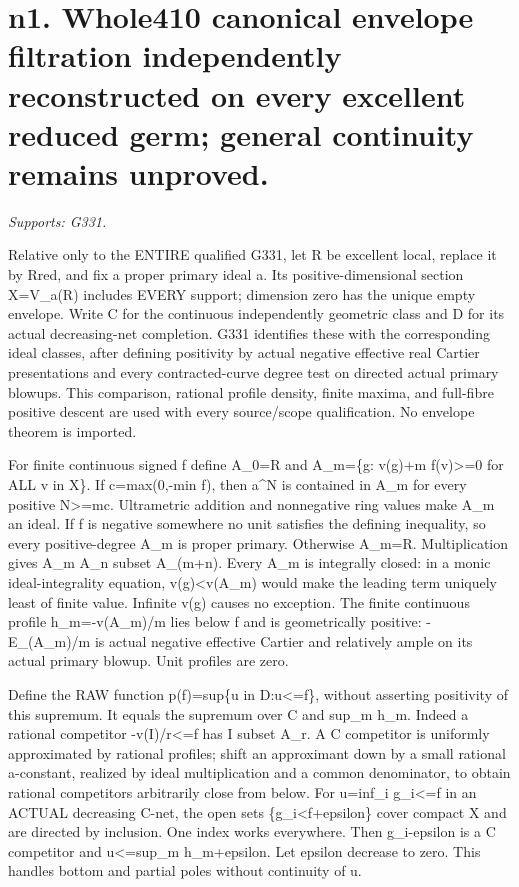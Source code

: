 \section{n1. Whole410 canonical envelope filtration independently reconstructed on every excellent reduced germ; general continuity remains unproved.}
\textit{Supports: G331.}

Relative only to the ENTIRE qualified G331, let R be excellent local, replace it by Rred, and fix a proper primary ideal a. Its positive-dimensional section X=V\_a(R) includes EVERY support; dimension zero has the unique empty envelope. Write C for the continuous independently geometric class and D for its actual decreasing-net completion. G331 identifies these with the corresponding ideal classes, after defining positivity by actual negative effective real Cartier presentations and every contracted-curve degree test on directed actual primary blowups. This comparison, rational profile density, finite maxima, and full-fibre positive descent are used with every source/scope qualification. No envelope theorem is imported.

For finite continuous signed f define A\_0=R and A\_m=\{g: v(g)+m f(v)\textgreater{}=0 for ALL v in X\}. If c=max(0,-min f), then a\textasciicircum{}N is contained in A\_m for every positive N\textgreater{}=mc. Ultrametric addition and nonnegative ring values make A\_m an ideal. If f is negative somewhere no unit satisfies the defining inequality, so every positive-degree A\_m is proper primary. Otherwise A\_m=R. Multiplication gives A\_m A\_n subset A\_(m+n). Every A\_m is integrally closed: in a monic ideal-integrality equation, v(g)\textless{}v(A\_m) would make the leading term uniquely least of finite value. Infinite v(g) causes no exception. The finite continuous profile h\_m=-v(A\_m)/m lies below f and is geometrically positive: -E\_(A\_m)/m is actual negative effective Cartier and relatively ample on its actual primary blowup. Unit profiles are zero.

Define the RAW function p(f)=sup\{u in D:u\textless{}=f\}, without asserting positivity of this supremum. It equals the supremum over C and sup\_m h\_m. Indeed a rational competitor -v(I)/r\textless{}=f has I subset A\_r. A C competitor is uniformly approximated by rational profiles; shift an approximant down by a small rational a-constant, realized by ideal multiplication and a common denominator, to obtain rational competitors arbitrarily close from below. For u=inf\_i g\_i\textless{}=f in an ACTUAL decreasing C-net, the open sets \{g\_i\textless{}f+epsilon\} cover compact X and are directed by inclusion. One index works everywhere. Then g\_i-epsilon is a C competitor and u\textless{}=sup\_m h\_m+epsilon. Let epsilon decrease to zero. This handles bottom and partial poles without continuity of u.

